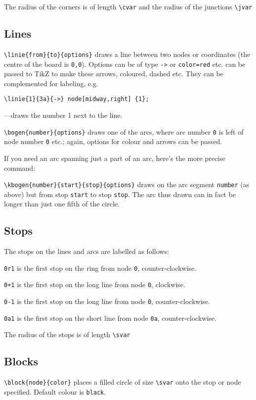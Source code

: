 \documentclass[a5paper]{scrartcl}
\begin{document}
The radius of the corners is of length \verb|\cvar| and the radius of the junctions \verb|\jvar|

\subsection*{Lines}

\verb|\linie{from}{to}{options}| draws a line between two nodes or coordinates (the centre of the board is \verb|0,0|). Options can be of type \verb|->| or \verb|color=red| etc. can be passed to TikZ to make these arrows, coloured, dashed etc. They can be complemented for labeling, e.g.

\verb|\linie{1}{3a}{->} node[midway,right] {1};|

---draws the number 1 next to the line.

\verb|\bogen{number}{options}| draws one of the arcs, where arc number \verb|0| is left of node number \verb|0| etc.; again, options for colour and arrows can be passed. 

If you need an arc spanning just a part of an arc, here's the more precise command:

\verb|\kbogen{number}{start}{stop}{options}| draws on the arc segment \verb|number| (as above) but from stop \verb|start| to stop  \verb|stop|. The arc thus drawn can in fact be longer than just one fifth of the circle. 

\subsection*{Stops}

The stops on the lines and arcs are labelled as follows:

\verb|0r1| is the first stop on the ring from node \verb|0|, counter-clockwise.
    
\verb|0+1| is the first stop on the long line from node \verb|0|, clockwise.
    
\verb|0-1| is the first stop on the long line from node \verb|0|, counter-clockwise.
    
\verb|0a1| is the first stop on the short line from node \verb|0a|, counter-clockwise.

The radius of the stops is of length \verb|\svar|

\subsection*{Blocks}

\verb|\block{node}{color}| places a filled circle of size \verb|\svar| onto the stop or node specified. Default colour is \verb|black|.
\end{document}
